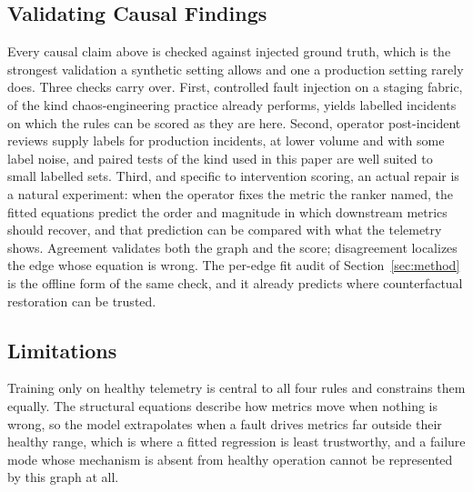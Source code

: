 \documentclass[conference]{IEEEtran}
\begin{document}
\subsection{Validating Causal Findings}
Every causal claim above is checked against injected ground truth, which is the strongest validation a synthetic setting allows and one a production setting rarely does. Three checks carry over. First, controlled fault injection on a staging fabric, of the kind chaos-engineering practice already performs, yields labelled incidents on which the rules can be scored as they are here. Second, operator post-incident reviews supply labels for production incidents, at lower volume and with some label noise, and paired tests of the kind used in this paper are well suited to small labelled sets. Third, and specific to intervention scoring, an actual repair is a natural experiment: when the operator fixes the metric the ranker named, the fitted equations predict the order and magnitude in which downstream metrics should recover, and that prediction can be compared with what the telemetry shows. Agreement validates both the graph and the score; disagreement localizes the edge whose equation is wrong. The per-edge fit audit of Section~\ref{sec:method} is the offline form of the same check, and it already predicts where counterfactual restoration can be trusted.

\subsection{Limitations}
\label{sec:limitations}
Training only on healthy telemetry is central to all four rules and constrains them equally. The structural equations describe how metrics move when nothing is wrong, so the model extrapolates when a fault drives metrics far outside their healthy range, which is where a fitted regression is least trustworthy, and a failure mode whose mechanism is absent from healthy operation cannot be represented by this graph at all.
\end{document}
